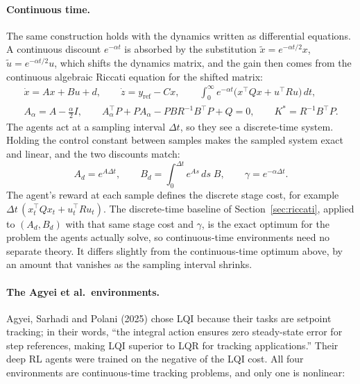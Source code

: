 \documentclass[11pt]{article}
\begin{document}
\paragraph{Continuous time.} The same construction holds with the dynamics written as differential
equations. A continuous discount $e^{-\alpha t}$ is absorbed by the substitution
$\tilde x = e^{-\alpha t/2} x$, $\tilde u = e^{-\alpha t/2} u$, which shifts the dynamics matrix, and
the gain then comes from the continuous algebraic Riccati equation for the shifted matrix:
\begin{gather*}
  \dot x = A x + B u + d, \qquad \dot z = y_{\mathrm{ref}} - C x, \qquad
  \int_0^\infty e^{-\alpha t}\big(x^\top Q x + u^\top R u\big)\, dt, \\
  A_\alpha = A - \tfrac{\alpha}{2} I, \qquad
  A_\alpha^\top P + P A_\alpha - P B R^{-1} B^\top P + Q = 0, \qquad K^* = R^{-1} B^\top P .
\end{gather*}
The agents act at a sampling interval $\Delta t$, so they see a discrete-time system. Holding the
control constant between samples makes the sampled system exact and linear, and the two discounts
match:
\[
  A_d = e^{A \Delta t}, \qquad B_d = \int_0^{\Delta t} e^{A s}\, ds\; B, \qquad
  \gamma = e^{-\alpha \Delta t} .
\]
The agent's reward at each sample defines the discrete stage cost, for example
$\Delta t\,(x_t^\top Q x_t + u_t^\top R u_t)$. The discrete-time baseline of
Section~\ref{sec:riccati}, applied to $(A_d, B_d)$ with that same stage cost and $\gamma$, is the exact
optimum for the problem the agents actually solve, so continuous-time environments need no separate
theory. It differs slightly from the continuous-time optimum above, by an amount that vanishes as the
sampling interval shrinks.

\paragraph{The Agyei et al.\ environments.} Agyei, Sarhadi and Polani (2025) chose LQI because their
tasks are setpoint tracking; in their words, ``the integral action ensures zero steady-state error for
step references, making LQI superior to LQR for tracking applications.'' Their deep RL agents were
trained on the negative of the LQI cost. All four environments are continuous-time tracking
problems, and only one is nonlinear:
\end{document}
